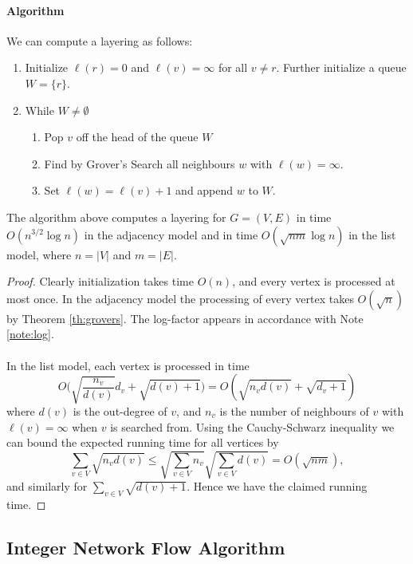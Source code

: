\paragraph{Algorithm}
We can compute a layering as follows:
\begin{enumerate}
\item Initialize $\ell(r) = 0$ and $\ell(v) = \infty$ for all $v \neq r$. Further initialize a queue $W = \{r\}$.
\item While $W\neq \emptyset$
	\begin{enumerate}
	\item Pop $v$ off the head of the queue $W$
	\item Find by Grover's Search all neighbours $w$ with $\ell(w) = \infty$.
	\item Set $\ell(w) = \ell(v) + 1$ and append $w$ to $W$.
	\end{enumerate} 
\end{enumerate}
\begin{theorem}\label{th:layering}
The algorithm above computes a layering for $G=(V,E)$  in time $O(n^{3/2}\log n)$ in the adjacency model and in time $O(\sqrt{nm}\log n)$ in the list model, where $n = |V|$ and $m = |E|$.
\end{theorem}
\begin{proof}
Clearly initialization takes time $O(n)$, and every vertex is processed at most once. In the adjacency model the processing of every vertex takes $O(\sqrt{n})$ by Theorem \ref{th:grovers}. The log-factor appears in accordance with Note \ref{note:log}.
\paragraph{}
In the list model, each vertex is processed in time $$O\big(\sqrt{\frac{n_v}{d(v)}}d_v + \sqrt{d(v) + 1}\big) = O(\sqrt{n_vd(v)} + \sqrt{d_v + 1})$$ where $d(v)$ is the out-degree of $v$, and $n_v$ is the number of neighbours of $v$ with $\ell(v)=\infty$ when $v$ is searched from. Using the Cauchy-Schwarz inequality we can bound the expected running time for all vertices by
$$\sum_{v\in V} \sqrt{n_vd(v)} \leq \sqrt{\sum_{v\in V} n_v}\sqrt{\sum_{v \in V} d(v)} = O(\sqrt{nm}),$$
and similarly for $\sum_{v \in V} \sqrt{d(v) + 1}$. Hence we have the claimed running time.
\end{proof}
\subsection{Integer Network Flow Algorithm}
